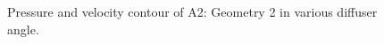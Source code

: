 \begin{figure}
    \noindent{}
    \caption{Pressure and velocity contour of A2: Geometry 2 in various diffuser angle.}
    \label{fig:2D_OF_A2_CONTOUR}
\end{figure}


\begin{figure}
    \noindent{}  
    \label{fig:2D_OF_A3_Contour1}
\end{figure}

